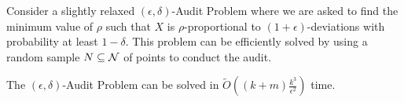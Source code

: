 
Consider a slightly relaxed $(\epsilon, \delta)$-Audit Problem where we are asked to find the minimum value of $\rho$ such that $X$ is $\rho$-proportional to $(1+\epsilon)$-deviations with probability at least $1-\delta$. %
This problem can be efficiently solved by using a random sample $N \subseteq \mathcal {N}$ of points to conduct the audit.

\begin{corollary}
\label{cor:fastAudit}
The $(\epsilon, \delta)$-Audit Problem can be solved in $\tilde{O}\left( \left(k + m \right)\frac{k^3}{\epsilon^2} \right)$ time.
\end{corollary}  



	
